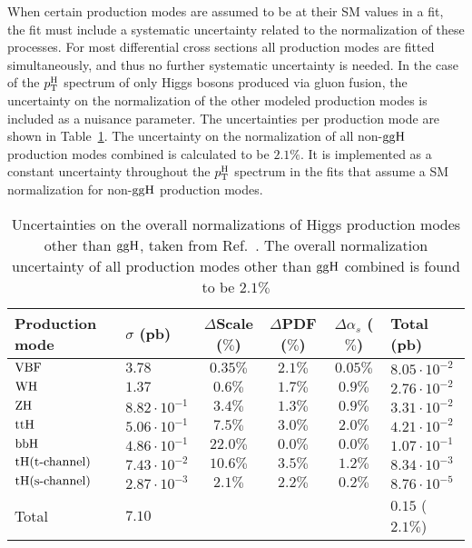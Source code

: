 
When certain production modes are assumed to be at their SM values in a fit, the fit must include a systematic uncertainty related to the normalization of these processes.
% 
For most differential cross sections all production modes are fitted simultaneously, and thus no further systematic uncertainty is needed.
% 
In the case of the $p_\mathrm{T}^\mathrm{H}$ spectrum of only Higgs bosons produced via gluon fusion, the uncertainty on the normalization of the other modeled production modes is included as a nuisance parameter.
% 
The uncertainties per production mode are shown in Table~\ref{tab:xhunc}.
% 
The uncertainty on the normalization of all non-$\mathrm{g}\mathrm{g}\mathrm{H}$ production modes combined is calculated to be $2.1\%$.
% 
It is implemented as a constant uncertainty throughout the $p_\mathrm{T}^\mathrm{H}$ spectrum in the fits that assume a SM normalization for non-$\mathrm{g}\mathrm{g}\mathrm{H}$ production modes.


\begin{table}[h!]
\footnotesize
\caption{
    Uncertainties on the overall normalizations of Higgs production modes other than $\mathrm{g}\mathrm{g}\mathrm{H}$, taken from Ref.~\cite{deFlorian:2016spz}.
    The overall normalization uncertainty of all production modes other than $\mathrm{g}\mathrm{g}\mathrm{H}$ combined is found to be $2.1\%$
    }
\label{tab:xhunc}
\begin{center}
\begin{tabular}{llcccl}
Production mode  &  $\sigma$ (pb)  &  $\Delta$Scale ($\%$)  &  $\Delta$PDF ($\%$)  &  $\Delta\alpha_s$ ($\%$)  &  Total (pb) \\
\hline
$\text{VBF}$                               & $3.78$                & $0.35\%$     & $2.1\%$      & $0.05\%$            & $8.05 \cdot 10^{-2}$ \\
$\mathrm{W}\mathrm{H}$                     & $1.37$                & $0.6\%$      & $1.7\%$      & $0.9\%$             & $2.76 \cdot 10^{-2}$ \\
$\mathrm{Z}\mathrm{H}$                     & $8.82 \cdot 10^{-1}$  & $3.4\%$      & $1.3\%$      & $0.9\%$             & $3.31 \cdot 10^{-2}$ \\
$\mathrm{t}\mathrm{t}\mathrm{H}$                               & $5.06 \cdot 10^{-1}$  & $7.5\%$      & $3.0\%$      & $2.0\%$             & $4.21 \cdot 10^{-2}$ \\
$\mathrm{b}\mathrm{b}\mathrm{H}$                               & $4.86 \cdot 10^{-1}$  & $22.0\%$     & $0.0\%$      & $0.0\%$             & $1.07 \cdot 10^{-1}$ \\
$\mathrm{t}\mathrm{H} (\text{t-channel})$  & $7.43 \cdot 10^{-2}$  & $10.6\%$     & $3.5\%$      & $1.2\%$             & $8.34 \cdot 10^{-3}$ \\
$\mathrm{t}\mathrm{H} (\text{s-channel})$  & $2.87 \cdot 10^{-3}$  & $2.1\%$      & $2.2\%$      & $0.2\%$             & $8.76 \cdot 10^{-5}$ \\
\hline
Total                                & $7.10$                &              &              &                     & $0.15$ ($2.1\%$) \\
\end{tabular}
\end{center}
\end{table}


